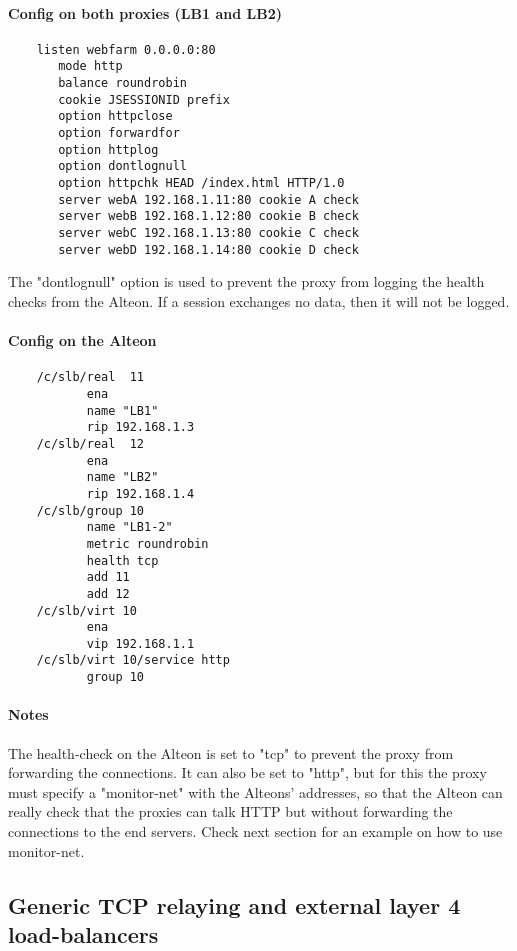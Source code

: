 \paragraph{Config on both proxies (LB1 and LB2)}

\begin{verbatim}
    listen webfarm 0.0.0.0:80
       mode http
       balance roundrobin
       cookie JSESSIONID prefix
       option httpclose
       option forwardfor
       option httplog
       option dontlognull
       option httpchk HEAD /index.html HTTP/1.0
       server webA 192.168.1.11:80 cookie A check
       server webB 192.168.1.12:80 cookie B check
       server webC 192.168.1.13:80 cookie C check
       server webD 192.168.1.14:80 cookie D check
\end{verbatim}

The "dontlognull" option is used to prevent the proxy from logging the health
checks from the Alteon. If a session exchanges no data, then it will not be
logged.
 
\paragraph{Config on the Alteon}

\begin{verbatim}
    /c/slb/real  11
           ena
           name "LB1"
           rip 192.168.1.3
    /c/slb/real  12
           ena
           name "LB2"
           rip 192.168.1.4
    /c/slb/group 10
           name "LB1-2"
           metric roundrobin
           health tcp
           add 11
           add 12
    /c/slb/virt 10
           ena
           vip 192.168.1.1
    /c/slb/virt 10/service http
           group 10
\end{verbatim}

\paragraph{Notes}

The health-check on the Alteon is set to "tcp" to prevent the proxy from
forwarding the connections. It can also be set to "http", but for this the
proxy must specify a "monitor-net" with the Alteons' addresses, so that the
Alteon can really check that the proxies can talk HTTP but without forwarding
the connections to the end servers. Check next section for an example on how to
use monitor-net.

\subsection{Generic TCP relaying and external layer 4 load-balancers}

